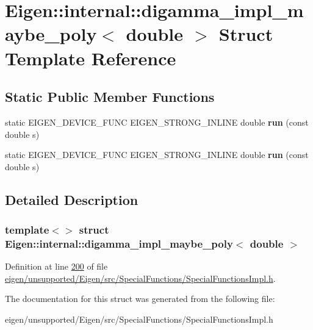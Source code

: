 \hypertarget{struct_eigen_1_1internal_1_1digamma__impl__maybe__poly_3_01double_01_4}{}\section{Eigen\+:\+:internal\+:\+:digamma\+\_\+impl\+\_\+maybe\+\_\+poly$<$ double $>$ Struct Template Reference}
\label{struct_eigen_1_1internal_1_1digamma__impl__maybe__poly_3_01double_01_4}
\subsection*{Static Public Member Functions}
\begin{DoxyCompactItemize}
\item 
\mbox{\label{struct_eigen_1_1internal_1_1digamma__impl__maybe__poly_3_01double_01_4_a7e20a3ee191776edec8201854e8694fa}} 
static E\+I\+G\+E\+N\+\_\+\+D\+E\+V\+I\+C\+E\+\_\+\+F\+U\+NC E\+I\+G\+E\+N\+\_\+\+S\+T\+R\+O\+N\+G\+\_\+\+I\+N\+L\+I\+NE double {\bfseries run} (const double s)
\item 
\mbox{\label{struct_eigen_1_1internal_1_1digamma__impl__maybe__poly_3_01double_01_4_a7e20a3ee191776edec8201854e8694fa}} 
static E\+I\+G\+E\+N\+\_\+\+D\+E\+V\+I\+C\+E\+\_\+\+F\+U\+NC E\+I\+G\+E\+N\+\_\+\+S\+T\+R\+O\+N\+G\+\_\+\+I\+N\+L\+I\+NE double {\bfseries run} (const double s)
\end{DoxyCompactItemize}


\subsection{Detailed Description}
\subsubsection*{template$<$$>$\newline
struct Eigen\+::internal\+::digamma\+\_\+impl\+\_\+maybe\+\_\+poly$<$ double $>$}



Definition at line \hyperlink{eigen_2unsupported_2_eigen_2src_2_special_functions_2_special_functions_impl_8h_source_l00200}{200} of file \hyperlink{eigen_2unsupported_2_eigen_2src_2_special_functions_2_special_functions_impl_8h_source}{eigen/unsupported/\+Eigen/src/\+Special\+Functions/\+Special\+Functions\+Impl.\+h}.



The documentation for this struct was generated from the following file\+:\begin{DoxyCompactItemize}
\item 
eigen/unsupported/\+Eigen/src/\+Special\+Functions/\+Special\+Functions\+Impl.\+h\end{DoxyCompactItemize}
